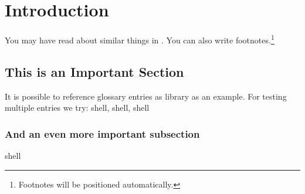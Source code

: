 \chapter{Introduction}\label{ch:intro}

You may have read about similar things in \cite{Goodliffe2007}.
You can also write footnotes.\footnote{Footnotes will be positioned automatically.}

\blindtext

\blindtext

\section{This is an Important Section}

It is possible to reference \gls{glossary} entries as \gls{library} as an example.
For testing multiple entries we try: \gls{shell}, \gls{shell}, \gls{shell}

\blindtext

\subsection{And an even more important subsection}
\blindtext

\gls{shell}
